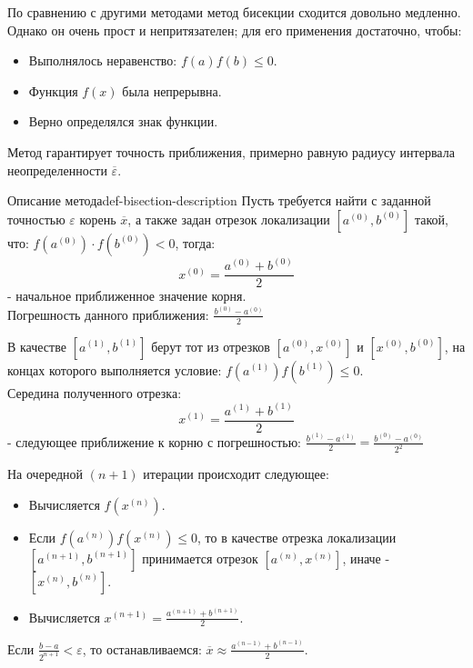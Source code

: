 \documentclass[14pt]{extarticle}
\begin{document}
        По сравнению с другими методами метод бисекции сходится довольно медленно. Однако он очень прост и непритязателен; для его применения достаточно, чтобы: 
        \begin{itemize}
            \item Выполнялось неравенство: $f(a)f(b) \leq 0$.
            \item Функция $f(x)$ была непрерывна.
            \item Верно определялся знак функции.
        \end{itemize}
            
        \vspace{\baselineskip}

        Метод гарантирует точность приближения, примерно равную радиусу интервала неопределенности $\overline{\varepsilon}$.

        \begin{definition}{Описание метода}{def-bisection-description}
            Пусть требуется найти с заданной точностью $\varepsilon$ корень $\overline{x}$, а также задан отрезок локализации $[a^{(0)}, b^{(0)}]$ такой, что: $f(a^{(0)}) \cdot f(b^{(0)}) < 0$, тогда:
            $$x^{(0)} = \frac{a^{(0)} + b^{(0)}}{2}$$
            - начальное приближенное значение корня.\\
            Погрешность данного приближения: $\frac{b^{(0)} - a^{(0)}}{2}$

            \vspace{\baselineskip}

            В качестве $[a^{(1)}, b^{(1)}]$ берут тот из отрезков $[a^{(0)}, x^{(0)}]$ и $[x^{(0)}, b^{(0)}]$, на концах которого выполняется условие: $f(a^{(1)})f(b^{(1)}) \leq 0$.\\
            Середина полученного отрезка: 
            $$x^{(1)} = \frac{a^{(1)} + b^{(1)}}{2}$$ 
            - следующее приближение к корню с погрешностью: $\frac{b^{(1)} - a^{(1)}}{2} = \frac{b^{(0)} - a^{(0)}}{2^{2}}$

            \vspace{\baselineskip}

            На очередной $(n + 1)$ итерации происходит следующее:
            \begin{itemize}
                \item Вычисляется $f(x^{(n)})$.
                \item Если $f(a^{(n)})f(x^{(n)}) \leq 0$, то в качестве отрезка локализации $[a^{(n + 1)}, b^{(n + 1)}]$ принимается отрезок $[a^{(n)}, x^{(n)}]$, иначе - $[x^{(n)}, b^{(n)}]$.
                \item Вычисляется $x^{(n + 1)} = \frac{a^{(n + 1)} + b^{(n + 1)}}{2}$.
            \end{itemize}

            \vspace{\baselineskip}

            Если $\frac{b - a}{2^{n + 1}} < \varepsilon$, то останавливаемся: $\overline{x} \approx \frac{a^{(n - 1)} + b^{(n - 1)}}{2}$.
        \end{definition}
\end{document}
